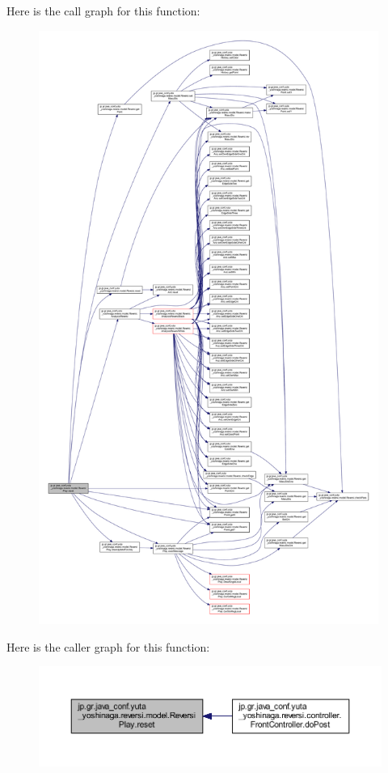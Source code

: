 Here is the call graph for this function\+:
\nopagebreak
\begin{figure}[H]
\begin{center}
\leavevmode
\includegraphics[height=550pt]{classjp_1_1gr_1_1java__conf_1_1yuta__yoshinaga_1_1reversi_1_1model_1_1_reversi_play_a040fddf6e59c00de4c9c2ecdaedcb574_cgraph}
\end{center}
\end{figure}
Here is the caller graph for this function\+:
\nopagebreak
\begin{figure}[H]
\begin{center}
\leavevmode
\includegraphics[width=350pt]{classjp_1_1gr_1_1java__conf_1_1yuta__yoshinaga_1_1reversi_1_1model_1_1_reversi_play_a040fddf6e59c00de4c9c2ecdaedcb574_icgraph}
\end{center}
\end{figure}
